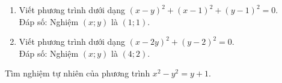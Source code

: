 \begin{bt}
{\begin{enumerate}
\begin{center}
\begin{tabular}{|m{2cm}|m{1cm}|m{1cm}|m{1cm}|m{1cm}|}
\end{tabular}
\end{center}
Do đó nghiệm $(x;y)$ là 
\begin{center}
\begin{tabular}{|m{2cm}|m{1cm}|m{1cm}|m{1cm}|m{1cm}|}
\hline
$x$ & $2$ & $2$ & $1$ & $1$\\\hline
$y$ & $4$ & $2$ & $4$ & $2$\\\hline
\end{tabular}
\end{center}
\item Viết phương trình dưới dạng $(x-y)^2+(x-1)^2+(y-1)^2=0.$\\
Đáp số: Nghiệm $(x;y)$ là $(1;1)$.
\item Viết phương trình dưới dạng $(x-2y)^2+(y-2)^2=0$.\\
Đáp số: Nghiệm $(x;y)$ là $(4;2)$.
\end{enumerate}
}
\end{bt}

\begin{bt}
Tìm nghiệm tự nhiên của phương trình $x^2-y^2=y+1$.
\end{bt}

